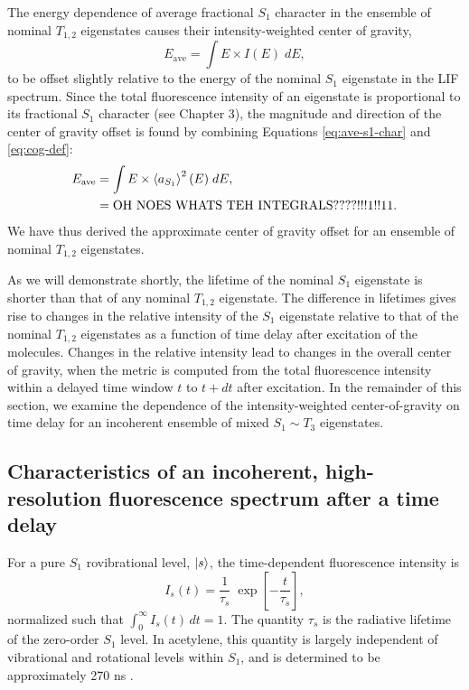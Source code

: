 \documentclass[12pt]{mitthesis}
\begin{document}
The energy dependence of average fractional $S_1$ character in the
ensemble of nominal $T_{1,2}$ eigenstates causes their
intensity-weighted center of gravity,
\begin{equation}
  \label{eq:cog-def}
  E_{\text{ave}} = \int E \times I(E) \; dE,
\end{equation}
to be offset slightly relative to the energy of the nominal $S_1$
eigenstate in the LIF spectrum.  Since the total fluorescence
intensity of an eigenstate is proportional to its fractional $S_1$
character (see Chapter 3), the magnitude and direction of the center
of gravity offset is found by combining Equations \ref{eq:ave-s1-char}
and \ref{eq:cog-def}:
\begin{equation}
  \begin{split}
    E_{\text{ave}} 
    &= \int E \times \mathinner{\langle{a_{S_1}}\rangle}^2(E) \; dE,\\
    &= \text{OH NOES WHATS TEH INTEGRALS????!!!1!!11}.
  \end{split}
\end{equation}
We have thus derived the approximate center of gravity offset for an
ensemble of nominal $T_{1,2}$ eigenstates.

As we will demonstrate shortly, the lifetime of the nominal $S_1$
eigenstate is shorter than that of any nominal $T_{1,2}$ eigenstate.
The difference in lifetimes gives rise to changes in the relative
intensity of the $S_1$ eigenstate relative to that of the nominal
$T_{1,2}$ eigenstates as a function of time delay after excitation of
the molecules.  Changes in the relative intensity lead to changes in
the overall center of gravity, when the metric is computed from the
total fluorescence intensity within a delayed time window $t$ to
$t+dt$ after excitation.  In the remainder of this section, we examine
the dependence of the intensity-weighted center-of-gravity on time
delay for an incoherent ensemble of mixed $S_1 \sim T_3$ eigenstates.





\subsection{Characteristics of an incoherent, high-resolution
  fluorescence spectrum after a time delay}

For a pure $S_1$ rovibrational level, $\mathinner{|{s}\rangle}$, the time-dependent
fluorescence intensity is
\begin{equation}
  I_s(t) = \frac{1}{\tau_s} \;
           \exp \left[
             -\frac{t}{ \tau_s} 
           \right],
\end{equation}
normalized such that $\int_0^{\infty} I_s(t) \, dt = 1$.  The quantity
$\tau_s$ is the radiative lifetime of the zero-order $S_1$ level.  In
acetylene, this quantity is largely independent of vibrational and
rotational levels within $S_1$, and is determined to be approximately
270 ns \cite{ochi91, stephenson84}.
\end{document}
